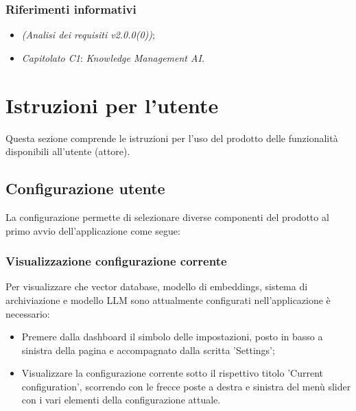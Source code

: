 \documentclass[10pt, a4paper]{article}
\begin{document}
\subsubsection{Riferimenti informativi}
\begin{itemize}
        \item \textit{(Analisi dei requisiti v2.0.0(0))};
        \item \textit{Capitolato C1}: \textit{Knowledge Management AI.}
        \end{itemize}

\newpage

\section{Istruzioni per l'utente}
Questa sezione comprende le istruzioni per l'uso del prodotto delle funzionalità disponibili all'utente (attore).
\subsection{Configurazione utente}
La configurazione permette di selezionare diverse componenti del prodotto al primo avvio dell'applicazione come segue:
\subsubsection{Visualizzazione configurazione corrente}
Per visualizzare che vector database, modello di embeddings, sistema di archiviazione e modello LLM sono attualmente configurati nell'applicazione è necessario:
\begin{itemize}
    \item Premere dalla dashboard il simbolo delle impostazioni, posto in basso a sinistra della pagina e accompagnato dalla scritta 'Settings';
    \item Visualizzare la configurazione corrente sotto il rispettivo titolo 'Current configuration', scorrendo con le frecce poste a destra e sinistra del menù slider con i vari elementi della configurazione attuale.
\end{itemize}
\end{document}
